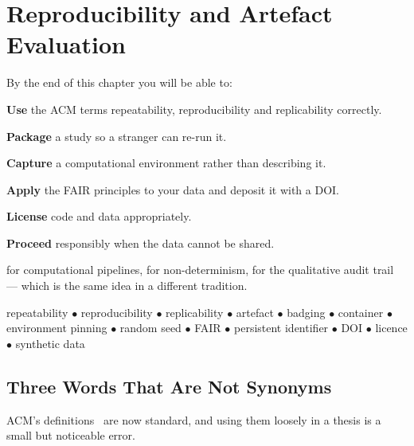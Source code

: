 \chapter{Reproducibility and Artefact Evaluation}\label{ch:reproducibility}

\begin{outcomes}
By the end of this chapter you will be able to:
\begin{tight}
  \item \textbf{Use} the ACM terms repeatability, reproducibility and
    replicability correctly.
  \item \textbf{Package} a study so a stranger can re-run it.
  \item \textbf{Capture} a computational environment rather than describing it.
  \item \textbf{Apply} the FAIR principles to your data and deposit it with a
    DOI.
  \item \textbf{License} code and data appropriately.
  \item \textbf{Proceed} responsibly when the data cannot be shared.
\end{tight}
\end{outcomes}

\begin{prereq}
 for computational pipelines,  for
non-determinism,  for the qualitative audit trail --- which is the
same idea in a different tradition.
\end{prereq}

\begin{keyterms}
repeatability $\bullet$ reproducibility $\bullet$ replicability $\bullet$
artefact $\bullet$ badging $\bullet$ container $\bullet$ environment pinning
$\bullet$ random seed $\bullet$ FAIR $\bullet$ persistent identifier $\bullet$
DOI $\bullet$ licence $\bullet$ synthetic data
\end{keyterms}

\section{Three Words That Are Not Synonyms}

ACM's definitions~\cite{acm2020badging} are now standard, and using them
loosely in a thesis is a small but noticeable error.

